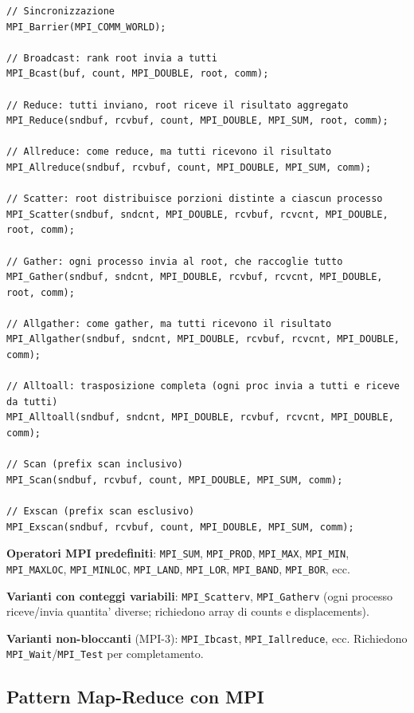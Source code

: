\documentclass[11pt,a4paper]{article}
\theoremstyle{remark}
\begin{document}
\begin{lstlisting}[style=cpp]
// Sincronizzazione
MPI_Barrier(MPI_COMM_WORLD);

// Broadcast: rank root invia a tutti
MPI_Bcast(buf, count, MPI_DOUBLE, root, comm);

// Reduce: tutti inviano, root riceve il risultato aggregato
MPI_Reduce(sndbuf, rcvbuf, count, MPI_DOUBLE, MPI_SUM, root, comm);

// Allreduce: come reduce, ma tutti ricevono il risultato
MPI_Allreduce(sndbuf, rcvbuf, count, MPI_DOUBLE, MPI_SUM, comm);

// Scatter: root distribuisce porzioni distinte a ciascun processo
MPI_Scatter(sndbuf, sndcnt, MPI_DOUBLE, rcvbuf, rcvcnt, MPI_DOUBLE, root, comm);

// Gather: ogni processo invia al root, che raccoglie tutto
MPI_Gather(sndbuf, sndcnt, MPI_DOUBLE, rcvbuf, rcvcnt, MPI_DOUBLE, root, comm);

// Allgather: come gather, ma tutti ricevono il risultato
MPI_Allgather(sndbuf, sndcnt, MPI_DOUBLE, rcvbuf, rcvcnt, MPI_DOUBLE, comm);

// Alltoall: trasposizione completa (ogni proc invia a tutti e riceve da tutti)
MPI_Alltoall(sndbuf, sndcnt, MPI_DOUBLE, rcvbuf, rcvcnt, MPI_DOUBLE, comm);

// Scan (prefix scan inclusivo)
MPI_Scan(sndbuf, rcvbuf, count, MPI_DOUBLE, MPI_SUM, comm);

// Exscan (prefix scan esclusivo)
MPI_Exscan(sndbuf, rcvbuf, count, MPI_DOUBLE, MPI_SUM, comm);
\end{lstlisting}

\textbf{Operatori MPI predefiniti}: \lstinline|MPI_SUM|, \lstinline|MPI_PROD|, \lstinline|MPI_MAX|, \lstinline|MPI_MIN|, \lstinline|MPI_MAXLOC|, \lstinline|MPI_MINLOC|, \lstinline|MPI_LAND|, \lstinline|MPI_LOR|, \lstinline|MPI_BAND|, \lstinline|MPI_BOR|, ecc.

\textbf{Varianti con conteggi variabili}: \lstinline|MPI_Scatterv|, \lstinline|MPI_Gatherv| (ogni processo riceve/invia quantita' diverse; richiedono array di counts e displacements).

\textbf{Varianti non-bloccanti} (MPI-3): \lstinline|MPI_Ibcast|, \lstinline|MPI_Iallreduce|, ecc. Richiedono \lstinline|MPI_Wait|/\lstinline|MPI_Test| per completamento.

\subsection{Pattern Map-Reduce con MPI}
\end{document}
